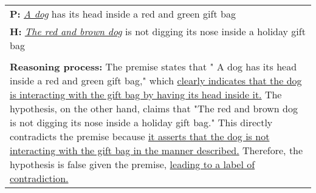 \begin{tabular}{p{8.5cm}}
\hline
\textbf{P:} \textit{\underline{A dog}} has its head inside a red and green gift bag \\ 
\textbf{H:} \textit{\underline{The red and brown dog}} is not digging its nose inside a holiday gift bag \\ \\
\vspace{-5mm}
\textbf{Reasoning process:}
The premise states that "{ A dog} has its head inside a red and green gift bag," which \ul{ clearly indicates that the dog is interacting with the gift bag by having its head inside it.} The hypothesis, on the other hand, claims that "The red and brown dog is not digging its nose inside a holiday gift bag." This directly contradicts the premise because  \ul{it asserts that the dog is not interacting with the gift bag in the manner described.} Therefore, the hypothesis is false given the premise, \ul{leading to a label of contradiction.}\\
\hline
\end{tabular}